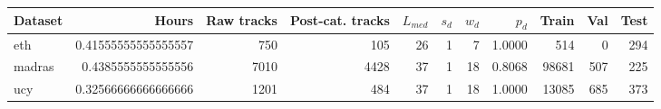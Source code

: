 \begin{tabular}{lrrrrrrrrrr}
Dataset & Hours & Raw tracks & Post-cat. tracks & $L_{med}$ & $s_d$ & $w_d$ & $p_d$ & Train & Val & Test \\
\hline
eth & 0.41555555555555557 & 750 & 105 & 26 & 1 & 7 & 1.0000 & 514 & 0 & 294 \\
madras & 0.4385555555555556 & 7010 & 4428 & 37 & 1 & 18 & 0.8068 & 98681 & 507 & 225 \\
ucy & 0.32566666666666666 & 1201 & 484 & 37 & 1 & 18 & 1.0000 & 13085 & 685 & 373 \\
\end{tabular}
